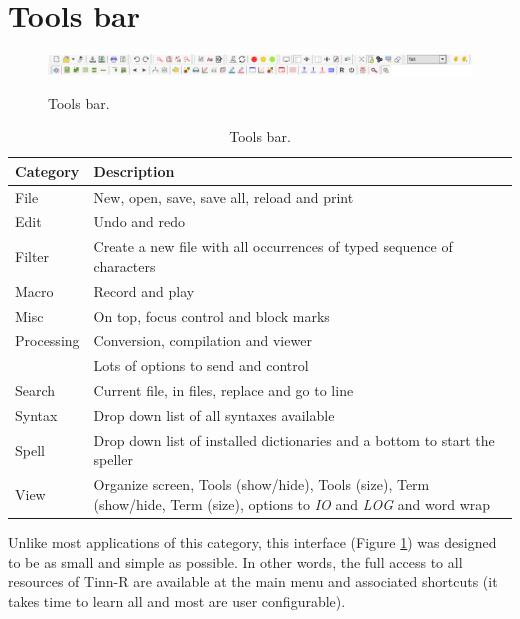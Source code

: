
\hypertarget{working_toolsbar}{}
\section{Tools bar}

\begin{figure}[H]
  \includegraphics[scale=0.35]{./res/toolsbar.png}\\
  \caption{Tools bar.}
  \label{fig:toolsbar}
\end{figure}

\begin{table}[H]
  \begin{footnotesize}
    \begin{tabularx}{\textwidth}{>{\hsize=0.3\hsize}X>{\hsize=0.7\hsize}X}\\
      \hline
      \textbf{Category} & \textbf{Description} \\
      \hline
      File & New, open, save, save all, reload and print \\
      Edit & Undo and redo \\
      Filter & Create a new file with all occurrences of typed sequence of characters \\
      Macro & Record and play \\
      Misc & On top, focus control and block marks \\
      Processing & Conversion, compilation and viewer \\
      \RR{} & Lots of options to send and control \RR{} \\
      Search & Current file, in files, replace and go to line \\
      Syntax & Drop down list of all syntaxes available \\
      Spell & Drop down list of installed dictionaries and a bottom to start the speller \\
      View & Organize screen, Tools (show/hide), Tools (size), Term (show/hide, Term (size), options to \textit{IO} and \textit{LOG} and word wrap \\
      \hline
    \end{tabularx}
  \end{footnotesize}
  \caption{Tools bar.}
  \label{tab:toolsbar}
\end{table}

Unlike most applications of this category, this interface
(Figure \ref{fig:toolsbar})
was designed to be
as small and simple as possible. In other words, the full access to all
resources of Tinn-R are available at the main menu and associated shortcuts
(it takes time to learn all and most are user configurable).

